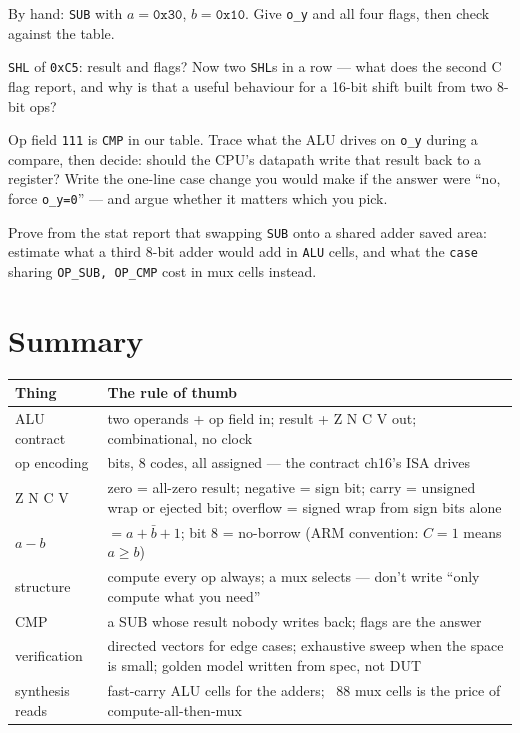 \begin{exercise}[easy]
By hand: \texttt{SUB} with $a=\texttt{0x30}$, $b=\texttt{0x10}$.
Give \texttt{o\_y} and all four flags, then check against the table.
\end{exercise}
\begin{exercise}[medium]
\texttt{SHL} of \texttt{0xC5}: result and flags? Now two \texttt{SHL}s
in a row --- what does the second C flag report, and why is that a
useful behaviour for a 16-bit shift built from two 8-bit ops?
\end{exercise}
\begin{exercise}[medium]
Op field \texttt{111} is \texttt{CMP} in our table. Trace what the
ALU drives on \texttt{o\_y} during a compare, then decide: should the
CPU's datapath write that result back to a register? Write the
one-line case change you would make if the answer were ``no, force
\texttt{o\_y=0}'' --- and argue whether it matters which you pick.
\end{exercise}
\begin{exercise}[hard]
Prove from the stat report that swapping \texttt{SUB} onto a shared
adder saved area: estimate what a third 8-bit adder would add in
\texttt{ALU} cells, and what the \texttt{case} sharing
\texttt{OP\_SUB, OP\_CMP} cost in mux cells instead.
\end{exercise}

\section{Summary}\label{sec:sum14}

\begin{center}
\begin{tabularx}{\textwidth}{l>{\raggedright\arraybackslash}X}
\toprule
\textbf{Thing} & \textbf{The rule of thumb}\\
\midrule
ALU contract & two operands + op field in; result + Z N C V out;
combinational, no clock\\
op encoding & 3 bits, 8 codes, all assigned --- the contract ch16's
ISA drives\\
Z N C V & zero = all-zero result; negative = sign bit; carry =
unsigned wrap or ejected bit; overflow = signed wrap from sign bits
alone\\
$a-b$ & $=a+\bar b+1$; bit 8 = no-borrow (ARM convention: $C=1$ means
$a\geq b$)\\
structure & compute every op always; a mux selects --- don't write
``only compute what you need''\\
CMP & a SUB whose result nobody writes back; flags are the answer\\
verification & directed vectors for edge cases; exhaustive sweep when
the space is small; golden model written from spec, not DUT\\
synthesis reads & 18 fast-carry ALU cells for the adders; ~88 mux
cells is the price of compute-all-then-mux\\
\bottomrule
\end{tabularx}
\end{center}

